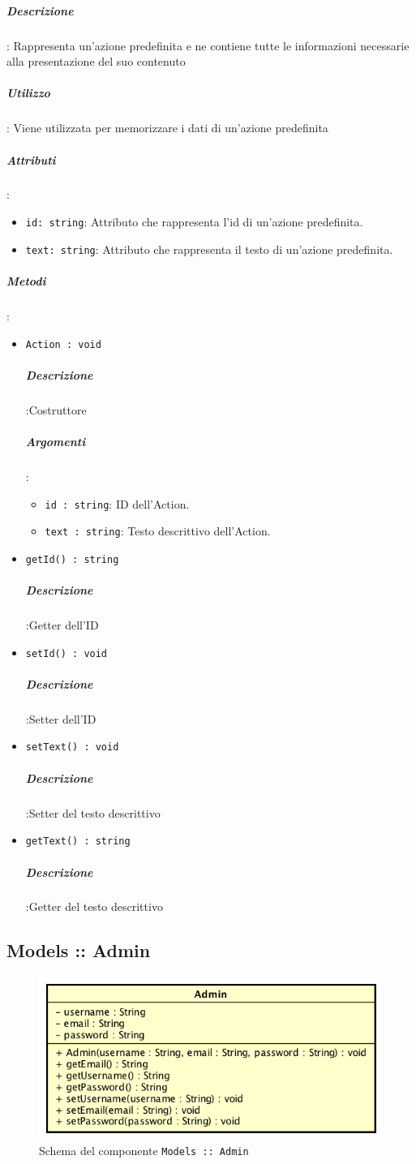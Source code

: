 \documentclass[../ManualeSviluppatore_v2.0.0.tex]{subfiles}
\begin{document}
		\subparagraph{Descrizione}: Rappresenta un'azione predefinita e ne contiene tutte le informazioni necessarie alla presentazione del suo contenuto
		\subparagraph{Utilizzo}: Viene utilizzata per memorizzare i dati di un'azione predefinita
		\subparagraph{Attributi}:
		      \begin{itemize}
		      	\item \texttt{id: string}:
		      	      Attributo che rappresenta l'id di un'azione predefinita.
		      	\item \texttt{text: string}:
		      	      Attributo che rappresenta il testo di un'azione predefinita.
		      \end{itemize}
		\subparagraph{Metodi}:
		      \begin{itemize}
		      	\item \texttt{Action : void}
		      	      \subparagraph{Descrizione}:Costruttore
					\subparagraph{Argomenti}:
						\begin{itemize}
							\item \texttt{id : string}:
								ID dell'Action.
							\item \texttt{text : string}:
								Testo descrittivo dell'Action.
						\end{itemize}

		      	\item \texttt{getId() : string}
		      	      \subparagraph{Descrizione}:Getter dell'ID

		      	\item \texttt{setId() : void}
		      	      \subparagraph{Descrizione}:Setter dell'ID

		      	\item \texttt{setText() : void}
		      	      \subparagraph{Descrizione}:Setter del testo descrittivo

		      	\item \texttt{getText() : string}
		      	      \subparagraph{Descrizione}:Getter del testo descrittivo
		      \end{itemize}



	\newpage
	\subsection{Models :: Admin}
	\begin{figure}[!h]
		\centering
		\includegraphics[scale=0.6]{Architettura/Front-End/Models/Admin.png}
		\caption{Schema del componente \texttt{Models :: Admin}}
	\end{figure}
\end{document}
